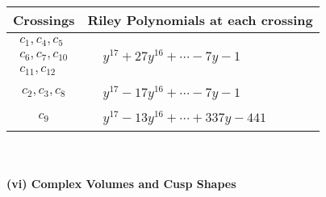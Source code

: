 \documentclass[1p]{elsarticle_modified}
\theoremstyle{definition}
\begin{document}
\begin{tabular}{m{50pt}|m{274pt}}
Crossings & \hspace{64pt}Riley Polynomials at each crossing \\
\hline $$\begin{aligned}c_{1},c_{4},c_{5}\\c_{6},c_{7},c_{10}\\c_{11},c_{12}\end{aligned}$$&$\begin{aligned}
&y^{17}+27 y^{16}+\cdots-7 y-1
\end{aligned}$\\
\hline $$\begin{aligned}c_{2},c_{3},c_{8}\end{aligned}$$&$\begin{aligned}
&y^{17}-17 y^{16}+\cdots-7 y-1
\end{aligned}$\\
\hline $$\begin{aligned}c_{9}\end{aligned}$$&$\begin{aligned}
&y^{17}-13 y^{16}+\cdots+337 y-441
\end{aligned}$\\
\hline
\end{tabular}\\~\\
\newpage\flushleft \textbf{(vi) Complex Volumes and Cusp Shapes}
\end{document}
